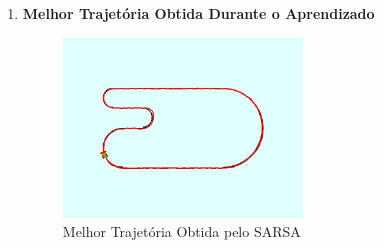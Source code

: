 \documentclass[a4paper,12pt]{article}
\begin{document}
\begin{enumerate}[label=2.1.\arabic*.]
    \item \textbf{Melhor Trajetória Obtida Durante o Aprendizado}\\
    \begin{figure}[!h]
    \centering
    \includegraphics[width=0.6\textwidth]{sarsa/line_follower_solution.jpeg}
    \caption{Melhor Trajetória Obtida pelo SARSA}
    \label{fig:sarsa_best_trajectory}
    \end{figure}
\end{enumerate}

\newpage
\end{document}
